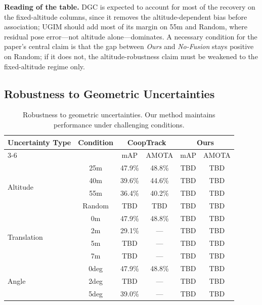 \documentclass[9.5pt,twocolumn,a4paper]{IEEEtran}
\begin{document}
\noindent\textbf{Reading of the table.} DGC is expected to account for most of the recovery on the fixed-altitude columns, since it removes the altitude-dependent bias before association; UGIM should add most of its margin on 55m and Random, where residual pose error---not altitude alone---dominates. A necessary condition for the paper's central claim is that the gap between \emph{Ours} and \emph{No-Fusion} stays positive on Random; if it does not, the altitude-robustness claim must be weakened to the fixed-altitude regime only.

\subsection{Robustness to Geometric Uncertainties}

\begin{table}[htbp]
    \centering
    \caption{Robustness to geometric uncertainties. Our method maintains performance under challenging conditions.}
    \begin{tabular}{l|c|cc|cc}
        \toprule
        \multirow{2}{*}{Uncertainty Type} & \multirow{2}{*}{Condition} & \multicolumn{2}{c|}{CoopTrack} & \multicolumn{2}{c}{Ours} \\
        \cline{3-6}
        & & mAP & AMOTA & mAP & AMOTA \\
        \midrule
        \multirow{4}{*}{Altitude} &
        25m & 47.9\% & 48.8\% & TBD & TBD \\
        & 40m & 39.6\% & 44.6\% & TBD & TBD \\
        & 55m & 36.4\% & 40.2\% & TBD & TBD \\
        & Random & TBD & TBD & TBD & TBD \\
        \midrule
        \multirow{4}{*}{Translation} &
        0m & 47.9\% & 48.8\% & TBD & TBD \\
        & 2m & 29.1\% & --- & TBD & TBD \\
        & 5m & TBD & --- & TBD & TBD \\
        & 7m & TBD & --- & TBD & TBD \\
        \midrule
        \multirow{3}{*}{Angle} &
        0deg & 47.9\% & 48.8\% & TBD & TBD \\
        & 2deg & TBD & --- & TBD & TBD \\
        & 5deg & 39.0\% & --- & TBD & TBD \\
        \bottomrule
    \end{tabular}
    \label{tab:robustness}
\end{table}
\end{document}
